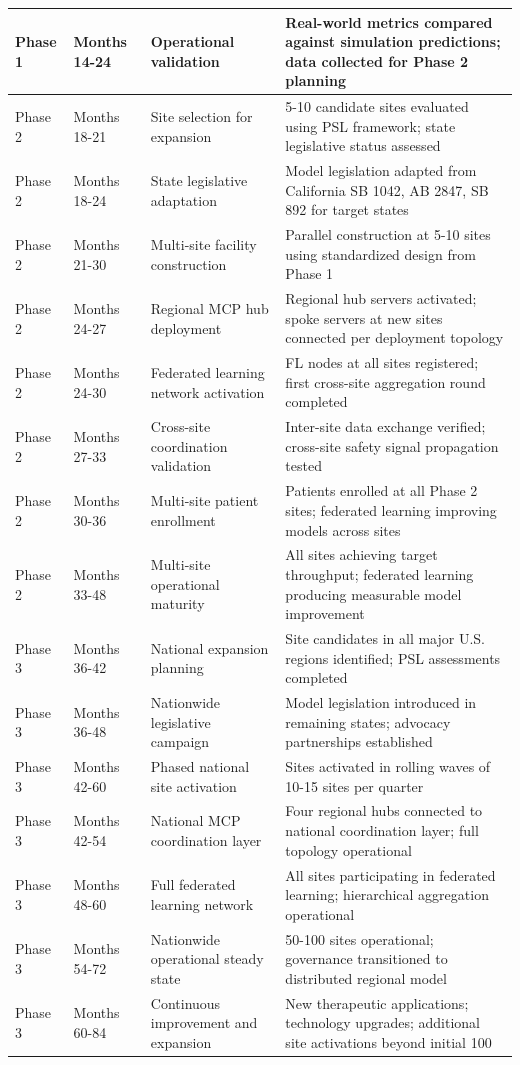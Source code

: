 \begin{longtable}{l l p{4.0cm} p{4.5cm}}
Phase 1 & Months 14-24 & Operational validation & Real-world metrics compared against simulation predictions; data collected for Phase 2 planning \\
\midrule
Phase 2 & Months 18-21 & Site selection for expansion & 5-10 candidate sites evaluated using PSL framework; state legislative status assessed \\
Phase 2 & Months 18-24 & State legislative adaptation & Model legislation adapted from California SB 1042, AB 2847, SB 892 for target states \\
Phase 2 & Months 21-30 & Multi-site facility construction & Parallel construction at 5-10 sites using standardized design from Phase 1 \\
Phase 2 & Months 24-27 & Regional MCP hub deployment & Regional hub servers activated; spoke servers at new sites connected per deployment topology \\
Phase 2 & Months 24-30 & Federated learning network activation & FL nodes at all sites registered; first cross-site aggregation round completed \\
Phase 2 & Months 27-33 & Cross-site coordination validation & Inter-site data exchange verified; cross-site safety signal propagation tested \\
Phase 2 & Months 30-36 & Multi-site patient enrollment & Patients enrolled at all Phase 2 sites; federated learning improving models across sites \\
Phase 2 & Months 33-48 & Multi-site operational maturity & All sites achieving target throughput; federated learning producing measurable model improvement \\
\midrule
Phase 3 & Months 36-42 & National expansion planning & Site candidates in all major U.S. regions identified; PSL assessments completed \\
Phase 3 & Months 36-48 & Nationwide legislative campaign & Model legislation introduced in remaining states; advocacy partnerships established \\
Phase 3 & Months 42-60 & Phased national site activation & Sites activated in rolling waves of 10-15 sites per quarter \\
Phase 3 & Months 42-54 & National MCP coordination layer & Four regional hubs connected to national coordination layer; full topology operational \\
Phase 3 & Months 48-60 & Full federated learning network & All sites participating in federated learning; hierarchical aggregation operational \\
Phase 3 & Months 54-72 & Nationwide operational steady state & 50-100 sites operational; governance transitioned to distributed regional model \\
Phase 3 & Months 60-84 & Continuous improvement and expansion & New therapeutic applications; technology upgrades; additional site activations beyond initial 100 \\
\end{longtable}

